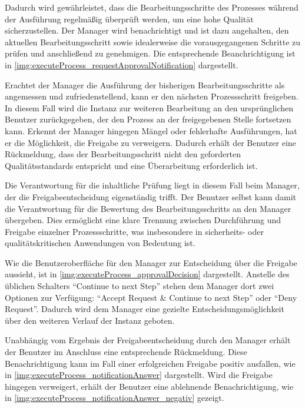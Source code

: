 \newpage
{}

Dadurch wird gewährleistet, dass die Bearbeitungsschritte des Prozesses während der Ausführung regelmäßig überprüft werden, um eine hohe Qualität sicherzustellen. Der Manager wird benachrichtigt und ist dazu angehalten, den aktuellen Bearbeitungsschritt sowie idealerweise die vorausgegangenen Schritte zu prüfen und anschließend zu genehmigen. Die entsprechende Beanchrichtigung ist in \autoref{img:executeProcess_requestApprovalNotification} dargestellt.


Erachtet der Manager die Ausführung der bisherigen Bearbeitungsschritte als angemessen und zufriedenstellend, kann er den nächsten Prozessschritt freigeben. In diesem Fall wird die Instanz zur weiteren Bearbeitung an den ursprünglichen Benutzer zurückgegeben, der den Prozess an der freigegebenen Stelle fortsetzen kann. Erkennt der Manager hingegen Mängel oder fehlerhafte Ausführungen, hat er die Möglichkeit, die Freigabe zu verweigern. Dadurch erhält der Benutzer eine Rückmeldung, dass der Bearbeitungsschritt nicht den geforderten Qualitätsstandards entspricht und eine Überarbeitung erforderlich ist.

Die Verantwortung für die inhaltliche Prüfung liegt in diesem Fall beim Manager, der die Freigabeentscheidung eigenständig trifft. Der Benutzer selbst kann damit die Verantwortung für die Bewertung des Bearbeitungsschritts an den Manager übergeben. Dies ermöglicht eine klare Trennung zwischen Durchführung und Freigabe einzelner Prozessschritte, was insbesondere in sicherheits- oder qualitätskritischen Anwendungen von Bedeutung ist.

Wie die Benutzeroberfläche für den Manager zur Entscheidung über die Freigabe aussieht, ist in \autoref{img:executeProcess_approvalDecision} dargestellt. Anstelle des üblichen Schalters \enquote{Continue to next Step} stehen dem Manager dort zwei Optionen zur Verfügung: \enquote{Accept Request \& Continue to next Step} oder \enquote{Deny Request}. Dadurch wird dem Manager eine gezielte Entscheidungsmöglichkeit über den weiteren Verlauf der Instanz geboten.


Unabhängig vom Ergebnis der Freigabeentscheidung durch den Manager erhält der Benutzer im Anschluss eine entsprechende Rückmeldung. Diese Benachrichtigung kann im Fall einer erfolgreichen Freigabe positiv ausfallen, wie in \autoref{img:executeProcess_notificationAnswer} dargestellt. Wird die Freigabe hingegen verweigert, erhält der Benutzer eine ablehnende Benachrichtigung, wie in \autoref{img:executeProcess_notificationAnswer_negativ} gezeigt.


